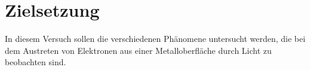 \section{Zielsetzung}
\label{sec:Zielsetzung}

In diesem Versuch sollen die verschiedenen Phänomene untersucht werden, die bei dem Austreten
von Elektronen aus einer Metalloberfläche durch Licht zu beobachten sind. \\
